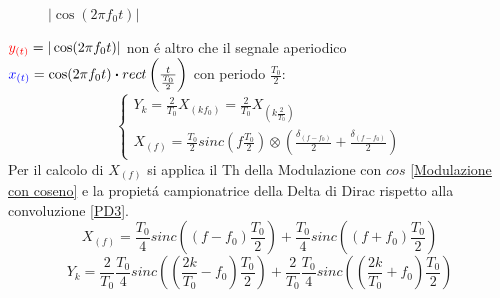                     \begin{figure}[H]
                        \centering
                        \caption{$|\cos(2\pi f_0t)|$}
                        \label{fig:cos 2pif_0t}
                    \end{figure}
                    ${\color{red}y_{(t)}} = |\cos(2\pi f_0t)|$ non é altro che il segnale aperiodico ${\color{blue}x_{(t)}} = \cos(2\pi f_0t) \dotproduct rect\left(\frac{t}{\frac{T_0}{2}}\right)$ con periodo $\frac{T_0}{2}$:
                    \[
                        \begin{cases}
                            Y_k = \frac{2}{T_0} X_{(kf_0)} = \frac{2}{T_0} X_{(k\frac{2}{T_0})}   \nonumber \\
                            X_{(f)} = \frac{T_0}{2}sinc(f\frac{T_0}{2}) \otimes \left(\frac{\delta_{(f-f_0)}}{2} + \frac{\delta_{(f-f_0)}}{2}\right)\nonumber
                        \end{cases}
                    \]
                    Per il calcolo di $X_{(f)}$ si applica il Th della Modulazione con $cos$ \ref{Modulazione con coseno} e la propietá campionatrice della Delta di Dirac rispetto alla convoluzione \ref{PD3}.
                    \[
                        X_{(f)} = \frac{T_0}{4}sinc\left((f-f_0)\frac{T_0}{2}\right) + \frac{T_0}{4}sinc\left((f+f_0)\frac{T_0}{2}\right)
                    \]
                    \[
                        Y_k = \frac{2}{T_0}\frac{T_0}{4}sinc\left((\frac{2k}{T_0}-f_0)\frac{T_0}{2}\right) +\frac{2}{T_0} \frac{T_0}{4}sinc\left((\frac{2k}{T_0}+f_0)\frac{T_0}{2}\right)
                    \]

